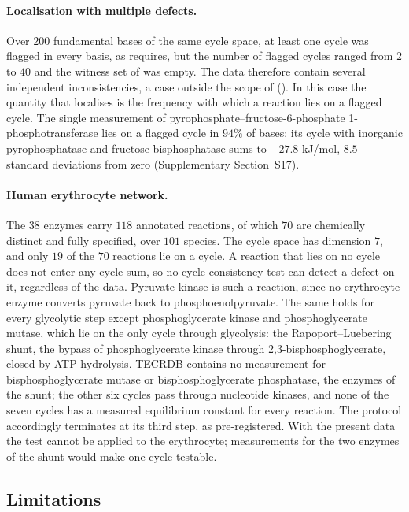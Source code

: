 \documentclass[11pt,a4paper]{article}
\theoremstyle{pstyle}
\theoremstyle{definition}
\theoremstyle{remark}
\begin{document}
\paragraph{Localisation with multiple defects.} Over $200$ fundamental
bases of the same cycle space, at least one cycle was flagged in every
basis, as  requires, but the number of flagged
cycles ranged from $2$ to $40$ and the witness set of
 was empty. The data therefore contain several
independent inconsistencies, a case outside the scope of
 (). In this case the
quantity that localises is the frequency with which a reaction lies on
a flagged cycle. The single measurement of
pyrophosphate--fructose-6-phosphate 1-phosphotransferase lies on a
flagged cycle in $94\%$ of bases; its cycle with inorganic
pyrophosphatase and fructose-bisphosphatase sums to $-27.8$ kJ/mol,
$8.5$ standard deviations from zero (Supplementary Section~S17).

\paragraph{Human erythrocyte network.} The $38$ enzymes carry $118$
annotated reactions, of which $70$ are chemically distinct and fully
specified, over $101$ species. The cycle space has dimension $7$, and
only $19$ of the $70$ reactions lie on a cycle. A reaction that lies on
no cycle does not enter any cycle sum, so no cycle-consistency test can
detect a defect on it, regardless of the data. Pyruvate kinase is such
a reaction, since no erythrocyte enzyme converts pyruvate back to
phosphoenolpyruvate. The same holds for every glycolytic step except
phosphoglycerate kinase and phosphoglycerate mutase, which lie on the
only cycle through glycolysis: the Rapoport--Luebering shunt, the bypass
of phosphoglycerate kinase through 2,3-bisphosphoglycerate, closed by
ATP hydrolysis. TECRDB contains no measurement for bisphosphoglycerate
mutase or bisphosphoglycerate phosphatase, the enzymes of the shunt; the
other six cycles pass through nucleotide kinases, and none of the seven
cycles has a measured equilibrium constant for every reaction. The
protocol accordingly terminates at its third step, as pre-registered.
With the present data the test cannot be applied to the erythrocyte;
measurements for the two enzymes of the shunt would make one cycle
testable.

\subsection{Limitations}
\label{sec:limits}
\end{document}
